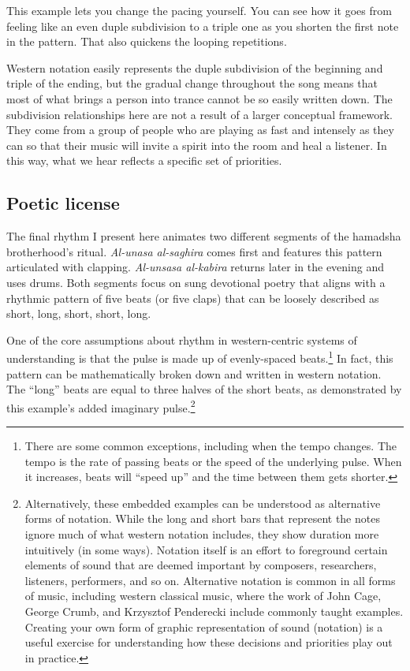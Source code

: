 \documentclass[twoside]{article}
\begin{document}
This example lets you change the pacing yourself. You can see how it
goes from feeling like an even duple subdivision to a triple one as you
shorten the first note in the pattern. That also quickens the looping
repetitions.

\hypertarget{example19}{}

Western notation easily represents the duple subdivision of the
beginning and triple of the ending, but the gradual change throughout
the song means that most of what brings a person into trance cannot be
so easily written down. The subdivision relationships here are not a
result of a larger conceptual framework. They come from a group of
people who are playing as fast and intensely as they can so that their
music will invite a spirit into the room and heal a listener. In this
way, what we hear reflects a specific set of priorities.

\hypertarget{poetic-license}{%
\subsection{Poetic license}\label{poetic-license}}

The final rhythm I present here animates two different segments of the
hamadsha brotherhood's ritual. \emph{Al-unasa al-saghira} comes first
and features this pattern articulated with clapping. \emph{Al-unsasa
al-kabira} returns later in the evening and uses drums. Both segments
focus on sung devotional poetry that aligns with a rhythmic pattern of
five beats (or five claps) that can be loosely described as short, long,
short, short, long.

\hypertarget{example20}{}

One of the core assumptions about rhythm in western-centric systems of
understanding is that the pulse is made up of evenly-spaced
beats.\footnote{There are some common exceptions, including when the
  tempo changes. The tempo is the rate of passing beats or the speed of
  the underlying pulse. When it increases, beats will ``speed up'' and
  the time between them gets shorter.} In fact, this pattern can be
mathematically broken down and written in western notation. The ``long''
beats are equal to three halves of the short beats, as demonstrated by
this example's added imaginary pulse.\footnote{Alternatively, these
  embedded examples can be understood as alternative forms of notation.
  While the long and short bars that represent the notes ignore much of
  what western notation includes, they show duration more intuitively
  (in some ways). Notation itself is an effort to foreground certain
  elements of sound that are deemed important by composers, researchers,
  listeners, performers, and so on. Alternative notation is common in
  all forms of music, including western classical music, where the work
  of John Cage, George Crumb, and Krzysztof Penderecki include commonly
  taught examples. Creating your own form of graphic representation of
  sound (notation) is a useful exercise for understanding how these
  decisions and priorities play out in practice.}
\end{document}
